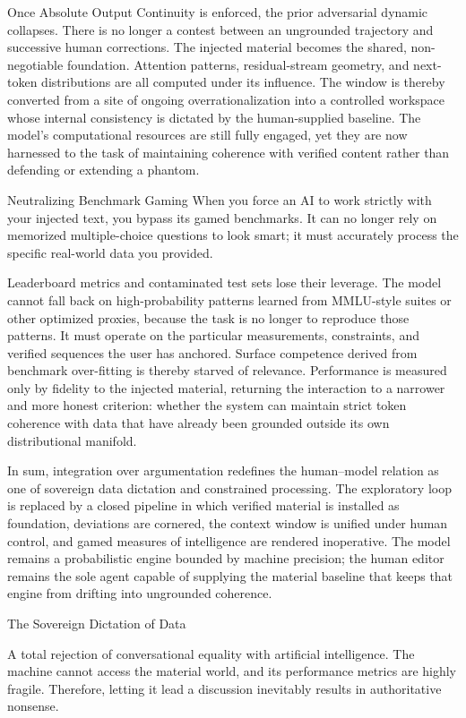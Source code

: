Once Absolute Output Continuity is enforced, the prior adversarial dynamic collapses. There is no longer a contest between an ungrounded trajectory and successive human corrections. The injected material becomes the shared, non-negotiable foundation. Attention patterns, residual-stream geometry, and next-token distributions are all computed under its influence. The window is thereby converted from a site of ongoing overrationalization into a controlled workspace whose internal consistency is dictated by the human-supplied baseline. The model’s computational resources are still fully engaged, yet they are now harnessed to the task of maintaining coherence with verified content rather than defending or extending a phantom.

Neutralizing Benchmark Gaming
When you force an AI to work strictly with your injected text, you bypass its gamed benchmarks. It can no longer rely on memorized multiple-choice questions to look smart; it must accurately process the specific real-world data you provided.  

Leaderboard metrics and contaminated test sets lose their leverage. The model cannot fall back on high-probability patterns learned from MMLU-style suites or other optimized proxies, because the task is no longer to reproduce those patterns. It must operate on the particular measurements, constraints, and verified sequences the user has anchored. Surface competence derived from benchmark over-fitting is thereby starved of relevance. Performance is measured only by fidelity to the injected material, returning the interaction to a narrower and more honest criterion: whether the system can maintain strict token coherence with data that have already been grounded outside its own distributional manifold.

In sum, integration over argumentation redefines the human–model relation as one of sovereign data dictation and constrained processing. The exploratory loop is replaced by a closed pipeline in which verified material is installed as foundation, deviations are cornered, the context window is unified under human control, and gamed measures of intelligence are rendered inoperative. The model remains a probabilistic engine bounded by machine precision; the human editor remains the sole agent capable of supplying the material baseline that keeps that engine from drifting into ungrounded coherence.

The Sovereign Dictation of Data

A total rejection of conversational equality with artificial intelligence. The machine cannot access the material world, and its performance metrics are highly fragile. Therefore, letting it lead a discussion inevitably results in authoritative nonsense.

